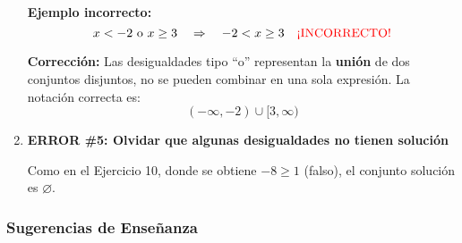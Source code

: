 \begin{enumerate}
    \textbf{Ejemplo incorrecto:}
    \[x < -2 \text{ o } x \ge 3 \quad \Rightarrow \quad -2 < x \ge 3 \quad \textcolor{red}{\text{¡INCORRECTO!}}\]

    \textbf{Corrección:} Las desigualdades tipo ``o'' representan la \textbf{unión} de dos conjuntos disjuntos, no se pueden combinar en una sola expresión. La notación correcta es:
    \[(-\infty, -2) \cup [3, \infty)\]

    \item \textbf{ERROR \#5: Olvidar que algunas desigualdades no tienen solución}

    Como en el Ejercicio 10, donde se obtiene $-8 \ge 1$ (falso), el conjunto solución es $\varnothing$.
\end{enumerate}

\subsubsection*{Sugerencias de Enseñanza}

